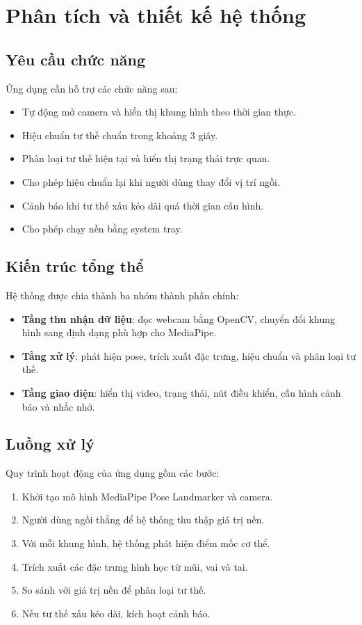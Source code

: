\documentclass[12pt,a4paper,oneside]{report}
\begin{document}
\chapter{Phân tích và thiết kế hệ thống}

\section{Yêu cầu chức năng}
Ứng dụng cần hỗ trợ các chức năng sau:
\begin{itemize}[leftmargin=1.2cm]
    \item Tự động mở camera và hiển thị khung hình theo thời gian thực.
    \item Hiệu chuẩn tư thế chuẩn trong khoảng 3 giây.
    \item Phân loại tư thế hiện tại và hiển thị trạng thái trực quan.
    \item Cho phép hiệu chuẩn lại khi người dùng thay đổi vị trí ngồi.
    \item Cảnh báo khi tư thế xấu kéo dài quá thời gian cấu hình.
    \item Cho phép chạy nền bằng system tray.
\end{itemize}

\section{Kiến trúc tổng thể}
Hệ thống được chia thành ba nhóm thành phần chính:
\begin{itemize}[leftmargin=1.2cm]
    \item \textbf{Tầng thu nhận dữ liệu}: đọc webcam bằng OpenCV, chuyển đổi khung hình sang định dạng phù hợp cho MediaPipe.
    \item \textbf{Tầng xử lý}: phát hiện pose, trích xuất đặc trưng, hiệu chuẩn và phân loại tư thế.
    \item \textbf{Tầng giao diện}: hiển thị video, trạng thái, nút điều khiển, cấu hình cảnh báo và nhắc nhở.
\end{itemize}

\section{Luồng xử lý}
Quy trình hoạt động của ứng dụng gồm các bước:
\begin{enumerate}[leftmargin=1.2cm]
    \item Khởi tạo mô hình MediaPipe Pose Landmarker và camera.
    \item Người dùng ngồi thẳng để hệ thống thu thập giá trị nền.
    \item Với mỗi khung hình, hệ thống phát hiện điểm mốc cơ thể.
    \item Trích xuất các đặc trưng hình học từ mũi, vai và tai.
    \item So sánh với giá trị nền để phân loại tư thế.
    \item Nếu tư thế xấu kéo dài, kích hoạt cảnh báo.
\end{enumerate}
\end{document}
